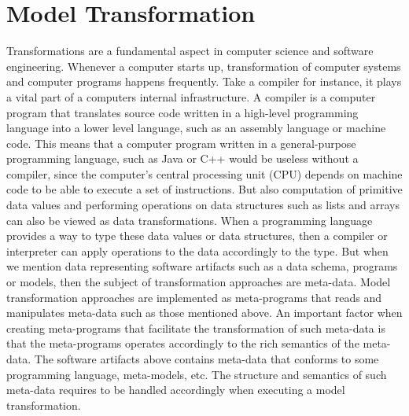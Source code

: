 
\chapter{Model Transformation} %

\label{Chapter3} %



Transformations are a fundamental aspect in computer science and software
engineering. Whenever a computer starts up, transformation of computer systems
and computer programs happens frequently. Take a compiler for instance, it plays
a vital part of a computers internal infrastructure. A compiler is a computer
program that translates source code written in a high-level programming
language into a lower level language, such as an assembly language or machine
code. This means that a computer program written in a general-purpose
programming language, such as Java or C++ would be useless without a compiler,
since the computer's central processing unit (CPU) depends on machine code to be
able to execute a set of instructions. But also computation of primitive data
values and performing operations on data structures such as lists and arrays can
also be viewed as data transformations. When a programming language provides a way
to type these data values or data structures, then a compiler or interpreter can
apply operations to the data accordingly to the type. But when we mention
data representing software artifacts such as a data schema, programs or models,
then the subject of transformation approaches are meta-data. Model
transformation approaches are implemented as meta-programs that reads and
manipulates meta-data such as those mentioned above. An important factor when
creating meta-programs that facilitate the transformation of such meta-data is
that the meta-programs operates accordingly to the rich semantics of the
meta-data. The software artifacts above contains meta-data that conforms to
some programming language, meta-models, etc. The structure and semantics of such
meta-data requires to be handled accordingly when executing a model
transformation.

